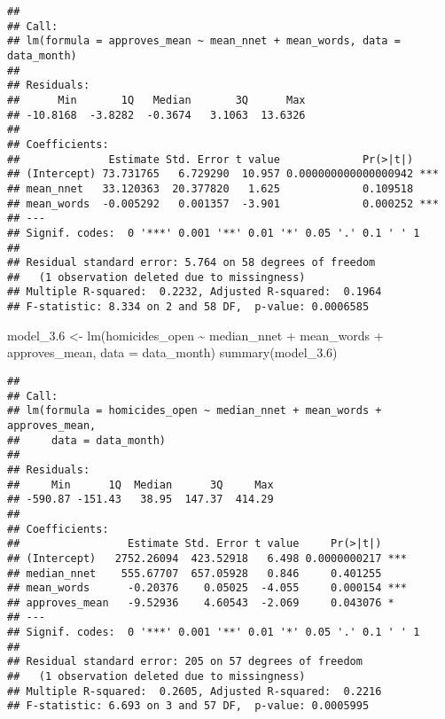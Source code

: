 \documentclass[
]{article}
\newenvironment{Shaded}{\begin{snugshade}}{\end{snugshade}}
\newcommand{\AttributeTok}[1]{\textcolor[rgb]{0.77,0.63,0.00}{#1}}
\newcommand{\FloatTok}[1]{\textcolor[rgb]{0.00,0.00,0.81}{#1}}
\newcommand{\FunctionTok}[1]{\textcolor[rgb]{0.00,0.00,0.00}{#1}}
\newcommand{\NormalTok}[1]{#1}
\newcommand{\OtherTok}[1]{\textcolor[rgb]{0.56,0.35,0.01}{#1}}
\newcommand{\SpecialCharTok}[1]{\textcolor[rgb]{0.00,0.00,0.00}{#1}}
\begin{document}
\begin{verbatim}
## 
## Call:
## lm(formula = approves_mean ~ mean_nnet + mean_words, data = data_month)
## 
## Residuals:
##      Min       1Q   Median       3Q      Max 
## -10.8168  -3.8282  -0.3674   3.1063  13.6326 
## 
## Coefficients:
##              Estimate Std. Error t value             Pr(>|t|)    
## (Intercept) 73.731765   6.729290  10.957 0.000000000000000942 ***
## mean_nnet   33.120363  20.377820   1.625             0.109518    
## mean_words  -0.005292   0.001357  -3.901             0.000252 ***
## ---
## Signif. codes:  0 '***' 0.001 '**' 0.01 '*' 0.05 '.' 0.1 ' ' 1
## 
## Residual standard error: 5.764 on 58 degrees of freedom
##   (1 observation deleted due to missingness)
## Multiple R-squared:  0.2232, Adjusted R-squared:  0.1964 
## F-statistic: 8.334 on 2 and 58 DF,  p-value: 0.0006585
\end{verbatim}

\begin{Shaded}
\begin{Highlighting}[]
\NormalTok{model\_3}\FloatTok{.6} \OtherTok{\textless{}{-}} \FunctionTok{lm}\NormalTok{(homicides\_open }\SpecialCharTok{\textasciitilde{}}\NormalTok{ median\_nnet }\SpecialCharTok{+}\NormalTok{ mean\_words }\SpecialCharTok{+}\NormalTok{ approves\_mean, }\AttributeTok{data =}\NormalTok{ data\_month)}
\FunctionTok{summary}\NormalTok{(model\_3}\FloatTok{.6}\NormalTok{)}
\end{Highlighting}
\end{Shaded}

\begin{verbatim}
## 
## Call:
## lm(formula = homicides_open ~ median_nnet + mean_words + approves_mean, 
##     data = data_month)
## 
## Residuals:
##     Min      1Q  Median      3Q     Max 
## -590.87 -151.43   38.95  147.37  414.29 
## 
## Coefficients:
##                 Estimate Std. Error t value     Pr(>|t|)    
## (Intercept)   2752.26094  423.52918   6.498 0.0000000217 ***
## median_nnet    555.67707  657.05928   0.846     0.401255    
## mean_words      -0.20376    0.05025  -4.055     0.000154 ***
## approves_mean   -9.52936    4.60543  -2.069     0.043076 *  
## ---
## Signif. codes:  0 '***' 0.001 '**' 0.01 '*' 0.05 '.' 0.1 ' ' 1
## 
## Residual standard error: 205 on 57 degrees of freedom
##   (1 observation deleted due to missingness)
## Multiple R-squared:  0.2605, Adjusted R-squared:  0.2216 
## F-statistic: 6.693 on 3 and 57 DF,  p-value: 0.0005995
\end{verbatim}
\end{document}
